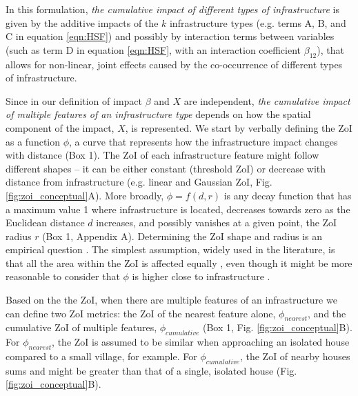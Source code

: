 \documentclass[titlepage]{article}
\begin{document}
In this formulation, \textit{the cumulative impact of different types of infrastructure} is given by the additive impacts of the $k$ infrastructure types (e.g. terms A, B, and C in equation \ref{eqn:HSF}) and possibly by interaction terms between variables (such as term D in equation \ref{eqn:HSF}, with an interaction coefficient $\beta_{12}$), that allows for non-linear, joint effects caused by the co-occurrence of different types of infrastructure. 

Since in our definition of impact $\beta$ and $X$ are independent, \textit{the cumulative impact of multiple features of an infrastructure type} depends on how the spatial component of the impact, $X$, is represented. We start by verbally defining the ZoI as a function $\phi$, a curve that represents how the infrastructure impact changes with distance (Box 1). The ZoI of each infrastructure feature might follow different shapes -- it can be either constant (threshold ZoI) or decrease with distance from infrastructure (e.g. linear and Gaussian ZoI, Fig. \ref{fig:zoi_conceptual}A). More broadly, $\phi = f(d, r)$ is any decay function that has a maximum value 1 where infrastructure is located, decreases towards zero as the Euclidean distance $d$ increases, and possibly vanishes at a given point, the ZoI radius $r$ (Box 1, Appendix A). Determining the ZoI shape and radius is an empirical question \citep{miguet_how_2017}. The simplest assumption, widely used in the literature, is that all the area within the ZoI is affected equally \citep[a buffer around features; e.g][]{quinonezpinon_design_2007}, even though it might be more reasonable to consider that $\phi$ is higher close to infrastructure \citep[][]{skarin_out_2018, zeller_multi-level_2017}. 

Based on the the ZoI, when there are multiple features of an infrastructure we can define two ZoI metrics: the ZoI of the nearest feature alone, $\phi_{nearest}$, and the cumulative ZoI of multiple features, $\phi_{cumulative}$ (Box 1, Fig. \ref{fig:zoi_conceptual}B). For $\phi_{nearest}$, the ZoI is assumed to be similar when approaching an isolated house compared to a small village, for example. For $\phi_{cumulative}$, the ZoI of nearby houses sums and might be greater than that of a single, isolated house (Fig. \ref{fig:zoi_conceptual}B).
\end{document}
